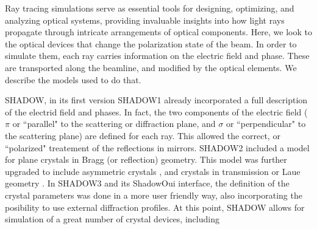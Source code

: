 \documentclass{iucr}
\begin{document}
Ray tracing simulations serve as essential tools for designing, optimizing, and analyzing optical systems, providing invaluable insights into how light rays propagate through intricate arrangements of optical components. Here, we look to the optical devices that change the polarization state of the beam. In order to simulate them, each ray carries information on the electric field and phase. These are transported along the beamline, and modified by the optical elements. We describe the models used to do that.

SHADOW, in its first version SHADOW1 \cite{Cerrina1984} already incorporated a full description of the electrid field and phases.
In fact, the two components of the electric field ($\pi$ or ``parallel" to the scattering or diffraction plane, and $\sigma$ or ``perpendicular" to the scattering plane) are defined for each ray. 
This allowed the correct, or ``polarized" treatement of the reflections in mirrors. SHADOW2 \cite{Lai1988} included a model for plane crystals in Bragg (or reflection) geometry.
This model was further upgraded to include asymmetric crystals \cite{SanchezdelRio1992}, and crystals in transmission or Laue geometry \cite{SanchezdelRio1994}.
In SHADOW3 \cite{codeSHADOW} and its ShadowOui \cite{codeSHADOWOUI} interface, the definition of the crystal parameters was done in a more user friendly way, also incorporating the posibility to use external diffraction profiles.
At this point, SHADOW allows for simulation of a great number of crystal devices, including
\end{document}
